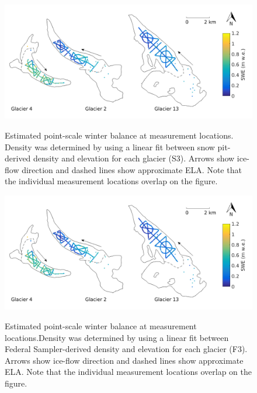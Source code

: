 \documentclass{sfuthesis}
\begin{document}
\begin{figure}[H]
	\centering
	\includegraphics[width = \textwidth]{SWEmap_opt6.png}\\
	\caption{Estimated point-scale winter balance at measurement locations. Density was determined by using a linear fit between snow pit-derived density and elevation for each glacier (S3). Arrows show ice-flow direction and dashed lines show approximate ELA. Note that the individual measurement locations overlap on the figure.}
	\label{fig:SWEmap_S3}
\end{figure}

\begin{figure}[H]
	\centering
	\includegraphics[width = \textwidth]{SWEmap_opt7.png}\\
	\caption{Estimated point-scale winter balance at measurement locations.Density was determined by using a linear fit between Federal Sampler-derived density and elevation for each glacier (F3). Arrows show ice-flow direction and dashed lines show approximate ELA. Note that the individual measurement locations overlap on the figure.}
	\label{fig:SWEmap_F3}
\end{figure}
\end{document}
